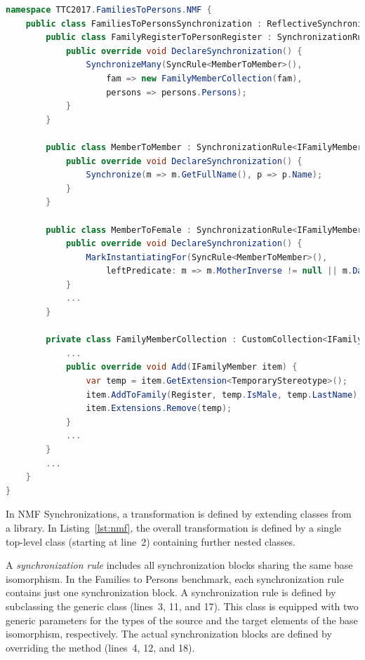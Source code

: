 \begin{lstlisting}[label={lst:nmf}, float=*t, language=cs, caption={Solution in NMF Synchronizations}]
namespace TTC2017.FamiliesToPersons.NMF {
    public class FamiliesToPersonsSynchronization : ReflectiveSynchronization {
        public class FamilyRegisterToPersonRegister : SynchronizationRule<FamilyRegister, PersonRegister> {
            public override void DeclareSynchronization() {
                SynchronizeMany(SyncRule<MemberToMember>(),
                    fam => new FamilyMemberCollection(fam),
                    persons => persons.Persons);
            }
        }

        public class MemberToMember : SynchronizationRule<IFamilyMember, IPerson> {
            public override void DeclareSynchronization() {
                Synchronize(m => m.GetFullName(), p => p.Name);
            }
        }
        
        public class MemberToFemale : SynchronizationRule<IFamilyMember, IFemale> {
            public override void DeclareSynchronization() {
                MarkInstantiatingFor(SyncRule<MemberToMember>(), 
                    leftPredicate: m => m.MotherInverse != null || m.DaughtersInverse != null);
            }
            ...
        }
        
        private class FamilyMemberCollection : CustomCollection<IFamilyMember> {
            ...
            public override void Add(IFamilyMember item) {
                var temp = item.GetExtension<TemporaryStereotype>();
                item.AddToFamily(Register, temp.IsMale, temp.LastName);
                item.Extensions.Remove(temp);
            }
            ...
        }
        ...
    }
}
\end{lstlisting} 

In NMF Synchronizations, a transformation is defined by extending classes from a library. In Listing~\ref{lst:nmf}, the overall transformation is defined by a single top-level class (starting at line~2) containing further nested classes.

A \emph{synchronization rule} includes all synchronization blocks sharing the same base isomorphism. In the Families to Persons benchmark, each synchronization rule contains just one synchronization block. A synchronization rule is defined by subclassing the generic class  (lines~3, 11, and 17). This class is equipped with two generic parameters for the types of the source and the target elements of the base isomorphism, respectively. The actual synchronization blocks are defined by overriding the method  (lines~4, 12, and 18). 

